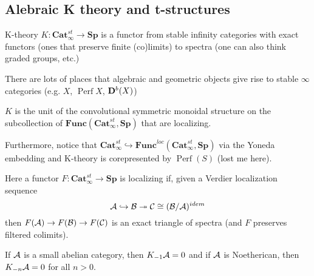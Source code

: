 \documentclass[12pt]{article}
\begin{document}
\subsection{Alebraic K theory and t-structures}
K-theory $K:\mathbf{Cat}_\infty^{st}\to\mathbf{Sp}$ is a functor from stable infinity categories with exact functors (ones that preserve finite (co)limits) to spectra (one can 
also think graded groups, etc.)

There are lots of places that algebraic and geometric objects give rise to stable $\infty$ categories (e.g. $X$, $\operatorname{Perf}X$, $\mathbf{D}^b(X)$)

\begin{defn}
	$K$ is the unit of the convolutional symmetric monoidal structure on the subcollection of $\mathbf{Func}(\mathbf{Cat}_\infty^{st},\mathbf{Sp})$ that are localizing.

	Furthermore, notice that $\mathbf{Cat}_\infty^{st}\hookrightarrow \mathbf{Func}^{loc}(\mathbf{Cat}_\infty^{st},\mathbf{Sp})$ via the Yoneda embedding and K-theory 
	is corepresented by $\operatorname{Perf}(S)$ (lost me here).
\end{defn}

Here a functor $F:\mathbf{Cat}_\infty^{st}\to\mathbf{Sp}$ is localizing if, given a Verdier localization sequence 
\[\mathcal{A}\hookrightarrow\mathcal{B}\twoheadrightarrow\mathcal{C}\cong(\mathcal{B}/\mathcal{A})^{idem}\]
then $F(\mathcal{A})\to F(\mathcal{B})\to F(\mathcal{C})$ is an exact triangle of spectra (and $F$ preserves filtered colimits).

\begin{thm}[Schlichting]
	If $\mathcal{A}$ is a small abelian category, then $K_{-1}\mathcal{A}=0$ and if $\mathcal{A}$ is Noetherican, then $K_{-n}\mathcal{A}=0$ for all $n>0.$
\end{thm}
\end{document}
